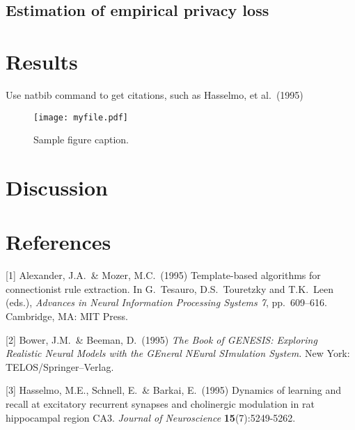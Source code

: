 \documentclass{article}
\begin{document}
\subsection{Estimation of empirical privacy loss}

\section{Results}
\label{results}

Use natbib command \citet{hasselmo} to get citations, such as  Hasselmo, et al.\ (1995)


\begin{figure}
  \centering
   \texttt{[image: myfile.pdf]}
  \caption{Sample figure caption.}
\end{figure}

\section{Discussion}


\section*{References}

[1] Alexander, J.A.\ \& Mozer, M.C.\ (1995) Template-based algorithms for
connectionist rule extraction. In G.\ Tesauro, D.S.\ Touretzky and T.K.\ Leen
(eds.), {\it Advances in Neural Information Processing Systems 7},
pp.\ 609--616. Cambridge, MA: MIT Press.

[2] Bower, J.M.\ \& Beeman, D.\ (1995) {\it The Book of GENESIS: Exploring
  Realistic Neural Models with the GEneral NEural SImulation System.}  New York:
TELOS/Springer--Verlag.

[3] Hasselmo, M.E., Schnell, E.\ \& Barkai, E.\ (1995) Dynamics of learning and
recall at excitatory recurrent synapses and cholinergic modulation in rat
hippocampal region CA3. {\it Journal of Neuroscience} {\bf 15}(7):5249-5262.
\end{document}
